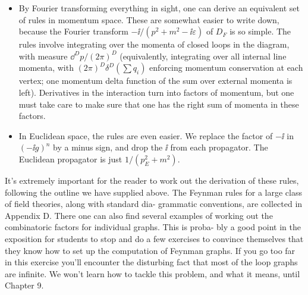 \begin{itemize}
\item By Fourier transforming everything in sight, one can derive an equivalent set of rules
in momentum space. These are somewhat easier to write down, because the Fourier
transform $-\ii/(p^2+m^2-\ii\varepsilon)$ of $D_F$ is so simple. The rules involve integrating over
the momenta of closed loops in the diagram, with measure $\dd^D p/(2\pi)^D$ (equivalently,
integrating over all internal line momenta, with $(2\pi)^D\delta^D(\sum q_i)$ enforcing momentum
conservation at each vertex; one momentum delta function of the sum over external
momenta is left). Derivatives in the interaction turn into factors of momentum, but
one must take care to make sure that one has the right sum of momenta in these
factors.
\item In Euclidean space, the rules are even easier. We replace the factor of $-\ii$ in $(-\ii g)^n$ by a
minus sign, and drop the $\ii$ from each propagator. The Euclidean propagator is just
$1/(p_E^2+m^2)$.
\end{itemize}

It's extremely important for the reader to work out the derivation of these rules,
following the outline we have supplied above.
The Feynman rules for a large class of field theories, along with standard dia-
grammatic conventions, are collected in Appendix D. There one can also find several
examples of working out the combinatoric factors for individual graphs. This is proba-
bly a good point in the exposition for students to stop and do a few exercises to convince
themselves that they know how to set up the computation of Feynman graphs. If you
go too far in this exercise you'll encounter the disturbing fact that most of the loop
graphs are infinite. We won't learn how to tackle this problem, and what it means, until
Chapter 9.
